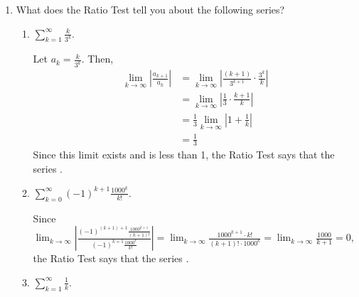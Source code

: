 \documentclass[main]{subfiles}
\begin{document}
\begin{enumerate}
  \item 
  What does the Ratio Test tell you about the following series?
  \begin{enumerate}
    \item
    
    \begin{problem}[0.9in]
    $\displaystyle \sum_{k=1}^\infty \frac{k}{3^k}$.
    \end{problem}

    \begin{solution}
    Let $a_k = \frac{k}{3^k}$.  Then,
    \begin{align*}
    \lim_{k \to \infty} \left| \frac{a_{k+1}}{a_k} \right| & =
    \lim_{k \to \infty} \left| \frac{(k + 1)}{3^{k+1}} \cdot \frac{3^k}{k}
    \right| \\
    & = \lim_{k \to \infty} \left| \frac{1}{3} \cdot \frac{k + 1}{k}
    \right| \\ 
    & = \frac{1}{3} \lim_{k \to \infty} \left| 1 + \frac{1}{k}
    \right| \\ 
    & = \frac{1}{3}
    \end{align*}
    Since this limit exists and is less than 1, the Ratio Test says that
    the series .
    \end{solution}
    
    \item

    
    \begin{problem}[0.9in]
    $\displaystyle\sum_{k=0}^\infty (-1)^{k + 1} \frac{1000^k}{k!}$. 
    \end{problem}

    \begin{solution}
    Since $\displaystyle \lim_{k \to \infty} \left| \frac{(-1)^{(k + 1)
    + 1} \frac{1000^{k + 1}}{(k + 1)!}}{(-1)^{k + 1}
    \frac{1000^k}{k!}} \right| = \lim_{k \to \infty}
    \frac{1000^{k+1} \cdot k!}{(k + 1)! \cdot1000^k} = \lim_{k \to
    \infty} \frac{1000}{k + 1} = 0$, the Ratio Test says that the
    series .
    \end{solution}

    \item
    \begin{problem}[0.9in]
    $\displaystyle \sum_{k=1}^\infty \frac{1}{k}$.
    \end{problem}


\end{enumerate}
\end{enumerate}
\end{document}
